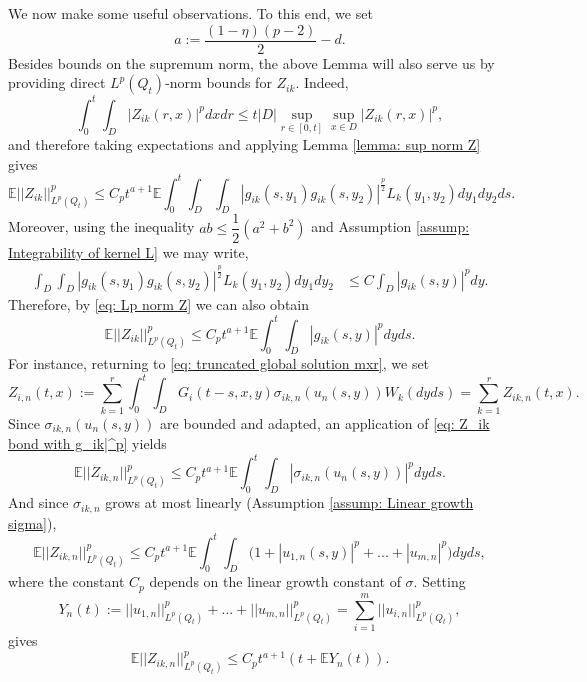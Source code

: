 \documentclass[12pt]{article}
\theoremstyle{definition}
\theoremstyle{remark}
\begin{document}
We now make some useful observations. To this end, we set
    \begin{equation}\label{eq: alpha}
a := \frac{(1-\eta)(p-2)}{2}-d.
    \end{equation}
Besides bounds on the supremum norm, the above Lemma will also serve us by providing direct $L^p(Q_t)$-norm bounds for $Z_{ik}$. Indeed, 
\[
\int_0^t\int_D |Z_{ik}(r,x)|^pdxdr\leq t|D|\sup_{r\in [0,t]}\sup_{x\in D} |Z_{ik}(r,x)|^p,
\]
and therefore
taking expectations and applying Lemma \ref{lemma: sup norm Z} gives
\begin{equation}\label{eq: Lp norm Z}
\mathbb E||Z_{ik}||_{L^p(Q_t)}^{p}
\leq C_p t^{a+1}
\mathbb E\int_0^t\int_D\int_D
|g_{ik}(s,y_1)g_{ik}(s,y_2)|^{\frac{p}{2}}
L_k(y_1,y_2)dy_1dy_2ds.
\end{equation}
Moreover, using the inequality $ab\leq \dfrac{1}{2}(a^2+b^2)$ and Assumption \ref{assump: Integrability of kernel L} we may write,
\begin{align*}
\int_D\int_D
|g_{ik}(s,y_1)g_{ik}(s,y_2)|^{\frac{p}{2}} L_k(y_1,y_2)dy_1dy_2&\leq C\int_D |g_{ik}(s,y)|^pdy.
\end{align*}
Therefore, by \eqref{eq: Lp norm Z} we can also obtain
\begin{equation}\label{eq: Z_ik bond with g_ik|^p}
\mathbb E||Z_{ik}||^p_{L^p(Q_t)} \leq C_pt^{a+1}\mathbb E \int_0^t\int_D |g_{ik}(s,y)|^p dyds.
\end{equation}
For instance, returning to \eqref{eq: truncated global solution mxr}, we set
\begin{equation}\label{eq: Z_i,n}
Z_{i,n}(t,x) := \sum_{k=1}^r\int_0^t\int_D G_i(t-s,x,y)\sigma_{ik,n}(u_n(s,y))W_k(dyds) = \sum_{k=1}^r Z_{ik,n}(t,x).
\end{equation}
Since $\sigma_{ik,n}(u_n(s,y))$ are bounded and adapted, an application of \eqref{eq: Z_ik bond with g_ik|^p} yields
\[
\mathbb E||Z_{ik,n}||^p_{L^p(Q_t)} \leq C_pt^{a+1}\mathbb E\int_0^t\int_D |\sigma_{ik,n}(u_n(s,y))|^pdyds.
\]
And since $\sigma_{ik,n}$ grows at most linearly (Assumption \ref{assump: Linear growth sigma}),
\begin{equation*}
\mathbb E||Z_{ik,n}||^p_{L^p(Q_t)} \leq C_pt^{a+1}\mathbb E\int_0^t \int_D\bigl(1+|u_{1,n}(s,y)|^p+...+|u_{m,n}|^p\bigr)dyds,
\end{equation*}
where the constant $C_p$ depends on the linear growth 
constant of $\sigma$. Setting
\[
Y_n(t) := ||u_{1,n}||^p_{L^p(Q_t)}+...+||u_{m,n}||^p_{L^p(Q_t)} = \sum_{i=1}^m ||u_{i,n}||_{L^p(Q_t)}^p,
\]
gives
\begin{equation*}\label{eq: Lp norm Z with Y}
    \mathbb E||Z_{ik,n}||^p_{L^p(Q_t)}\leq C_pt^{a+1}(t+\mathbb EY_n(t)).
\end{equation*}
\end{document}
